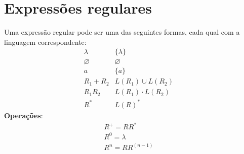 \documentclass[11pt]{article}
\begin{document}
\section{Expressões regulares}
\label{sec:org20fc6d9}
Uma expressão regular pode ser uma das seguintes formas, cada qual com a linguagem
correspondente:
\begin{align*}
  & \lambda & \{\lambda\} && \\
  & \varnothing & \varnothing && \\
  & a & \{a\} && \\
  & R_1 + R_2 & L(R_1) \cup L(R_2)  && \\
  & R_1 R_2 & L(R_1) \cdot L(R_2)  && \\
  & R^* & L(R)^* 
\end{align*}
\textbf{Operações}:
\begin{align*}
  & R^+ = RR^* && \\
  & R^0 = \lambda && \\
  & R^n = RR^{(n - 1)} &&
\end{align*}
\end{document}
